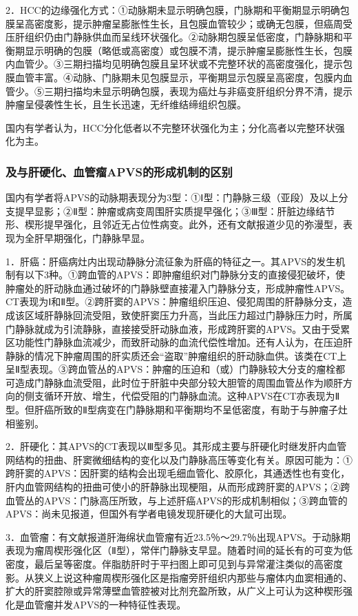 2．HCC的边缘强化方式：①动脉期未显示明确包膜，门脉期和平衡期显示明确包膜呈高密度影，提示肿瘤呈膨胀性生长，且包膜血管较少；或确无包膜，但癌周受压肝组织仍由门静脉供血而呈线环状强化。②动脉期包膜呈低密度，门静脉期和平衡期显示明确的包膜（略低或高密度）或包膜不清，提示肿瘤呈膨胀性生长，包膜内血管少。③三期扫描均见明确包膜且呈环状或不完整环状的高密度强化，提示包膜血管丰富。④动脉、门脉期未见包膜显示，平衡期显示包膜呈高密度，包膜内血管少。⑤三期扫描均未显示明确包膜，表现为癌灶与非癌变肝组织分界不清，提示肿瘤呈侵袭性生长，且生长迅速，无纤维结缔组织包膜。

国内有学者认为，HCC分化低者以不完整环状强化为主；分化高者以完整环状强化为主。

\subsubsection{及与肝硬化、血管瘤APVS的形成机制的区别}

国内有学者将APVS的动脉期表现分为3型：①Ⅰ型：门静脉三级（亚段）及以上分支提早显影；②Ⅱ型：肿瘤或病变周围肝实质提早强化；③Ⅲ型：肝脏边缘结节形、楔形提早强化，且邻近无占位性病变。此外，还有文献报道少见的弥漫型，表现为全肝早期强化，门静脉早显。

1．肝癌：肝癌病灶内出现动静脉分流征象为肝癌的特征之一。其APVS的发生机制有以下3种。①跨血管的APVS：即肿瘤组织对门静脉分支的直接侵犯破坏，使肿瘤处的肝动脉血通过破坏的门静脉壁直接灌入门静脉分支，形成肿瘤性APVS。CT表现为Ⅰ和Ⅱ型。②跨肝窦的APVS：肿瘤组织压迫、侵犯周围的肝静脉分支，造成该区域肝静脉回流受阻，致使肝窦压力升高，当此压力超过门静脉压力时，所属门静脉就成为引流静脉，直接接受肝动脉血液，形成跨肝窦的APVS。又由于受累区功能性门静脉血流减少，而致肝动脉的血流代偿性增加。还有人认为，在压迫肝静脉的情况下肿瘤周围的肝实质还会“盗取”肿瘤组织的肝动脉血供。该类在CT上呈Ⅱ型表现。③跨血管丛的APVS：肿瘤的压迫和（或）门静脉较大分支的瘤栓都可造成门静脉血流受阻，此时位于肝脏中央部分较大胆管的周围血管丛作为顺肝方向的侧支循环开放、增生，代偿受阻的门静脉血流。这种APVS在CT亦表现为Ⅱ型。但肝癌所致的Ⅱ型病变在门静脉期和平衡期均不呈低密度，有助于与肿瘤子灶相鉴别。

2．肝硬化：其APVS的CT表现以Ⅲ型多见。其形成主要与肝硬化时继发肝内血管网结构的扭曲、肝窦微细结构的变化以及门静脉高压等变化有关。原因可能为：①跨肝窦的APVS：因肝窦的结构会出现毛细血管化、胶原化，其通透性也有变化，肝内血管网结构的扭曲可使小的肝静脉出现梗阻，从而形成跨肝窦的APVS；②跨血管丛的APVS：门脉高压所致，与上述肝癌APVS的形成机制相似；③跨血管的APVS：尚未见报道，但国外有学者电镜发现肝硬化的大鼠可出现。

3．血管瘤：有文献报道肝海绵状血管瘤有近23.5％～29.7％出现APVS。于动脉期表现为瘤周楔形强化区（Ⅱ型），常伴门静脉支早显。随着时间的延长有的可变为低密度，最后呈等密度。伴脂肪肝时于平扫图上即可见到与异常灌注类似的高密度影。从狭义上说这种瘤周楔形强化区是指瘤旁肝组织内那些与瘤体内血窦相通的、扩大的肝窦腔隙或异常薄壁血管腔被对比剂充盈所致，从广义上可认为这种楔形强化是血管瘤并发APVS的一种特征性表现。

